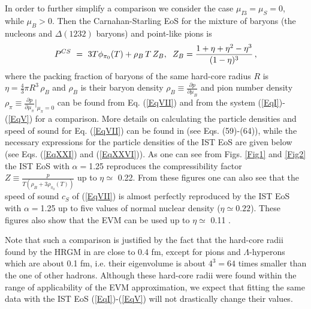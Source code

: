 \documentclass[12pt]{article}
\begin{document}
In order to further  simplify a comparison we consider the case  $\mu_{I3} = \mu_S =0$, while $\mu_B > 0$.  Then the 
 Carnahan-Starling  EoS \cite{CSeos} for the mixture of baryons (the nucleons and $\Delta (1232)$  baryons) and point-like pions is   \cite{SSpeed}
%
\begin{eqnarray}
%
\label{EqVII}
P^{CS}~=~{ 3 T \phi_{\pi_0} (T)}  +  \rho_B\, T  \, Z_B, 
%
\hspace*{0.2cm} Z_B = \frac{1+\eta +\eta^2 - \eta^3}{(1 - \eta)^{3}} \,,
%
\end{eqnarray}
%
where the packing fraction of baryons  of the same hard-core radius $R$  is $\eta =  \frac{4}{3} \pi R^3 \, \rho_B$ and  $\rho_B$ is   their  baryon density $\rho_B \equiv \frac{\partial p}{\partial \mu_B}$ and pion number density $\rho_\pi  \equiv  \frac{\partial  p}{\partial \mu_\pi} \biggl|_{\mu_\pi = 0}$ can be  found from  Eq. (\ref{EqVII}) and from the system (\ref{EqI})-(\ref{EqV})  for a comparison.  
More details on calculating the particle densities and speed of sound  for Eq.  (\ref{EqVII}) can be found  in  \cite{SSpeed} (see Eqs. (59)-(64)), while the necessary expressions for the particle densities of the IST EoS are given below  (see Eqs. (\ref{EqXXI}) and (\ref{EqXXVI})).
As one can see from Figs. \ref{Fig1} and 
\ref{Fig2}    the IST EoS  with $\alpha=$1.25 reproduces the compressibility factor 
$Z \equiv \frac{p}{T (\rho_B + 3 \rho_{\pi_0} (T))}$  up to  
$\eta \simeq$ 0.22.  From these figures one can  also see that the speed of sound $c_S$ of  (\ref{EqVII}) is almost perfectly reproduced by the IST EoS with $\alpha=$1.25 up to five values of normal nuclear density ($\eta \simeq 0.22$).  These figures also show 
that the EVM can be used up to $\eta \simeq$ 0.11 \cite{SSpeed}. 

Note that such a comparison is justified by the fact that the hard-core radii found by the HRGM in \cite{Veta14} are close to 0.4 fm, except for pions and $\Lambda$-hyperons which are about 0.1 fm, i.e. their eigenvolume   is about  $4^3 = 64$ times smaller than the one of other hadrons. 
Although  these hard-core radii were found within the range of applicability of the EVM  approximation, we expect that  fitting the same data with the IST EoS (\ref{EqI})-(\ref{EqV})  will not drastically change their values. 
\end{document}
